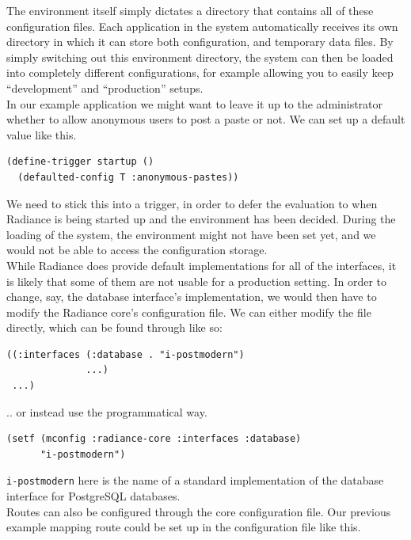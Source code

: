 \documentclass{sig-alternate}
\begin{document}
The environment itself simply dictates a directory that contains all of these configuration files. Each application in the system automatically receives its own directory in which it can store both configuration, and temporary data files. By simply switching out this environment directory, the system can then be loaded into completely different configurations, for example allowing you to easily keep ``development'' and ``production'' setups. \\

In our example application we might want to leave it up to the administrator whether to allow anonymous users to post a paste or not. We can set up a default value like this.

\begin{verbatim}
(define-trigger startup ()
  (defaulted-config T :anonymous-pastes))
\end{verbatim}

We need to stick this into a trigger, in order to defer the evaluation to when Radiance is being started up and the environment has been decided. During the loading of the system, the environment might not have been set yet, and we would not be able to access the configuration storage. \\

While Radiance does provide default implementations for all of the interfaces, it is likely that some of them are not usable for a production setting. In order to change, say, the database interface's implementation, we would then have to modify the Radiance core's configuration file. We can either modify the file directly, which can be found through  like so:

\begin{verbatim}
((:interfaces (:database . "i-postmodern")
              ...)
 ...)
\end{verbatim}

.. or instead use the programmatical way.

\begin{verbatim}
(setf (mconfig :radiance-core :interfaces :database)
      "i-postmodern")
\end{verbatim}

\texttt{i-postmodern} here is the name of a standard implementation of the database interface for PostgreSQL databases. \\

Routes can also be configured through the core configuration file. Our previous example mapping route could be set up in the configuration file like this.
\end{document}
